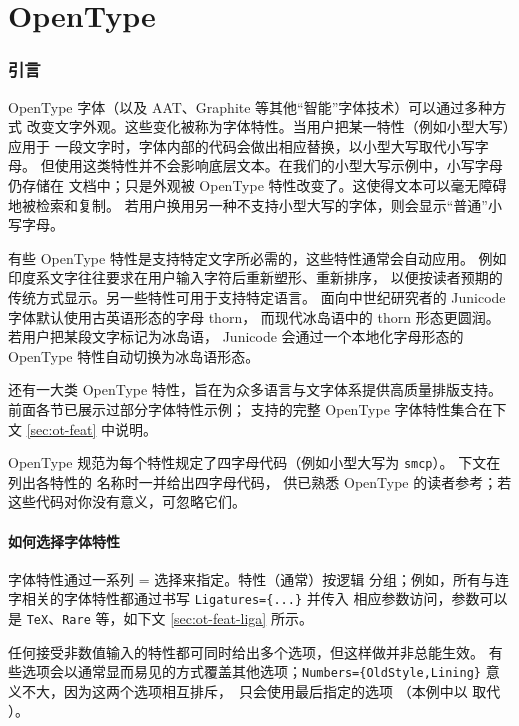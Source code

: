 \documentclass[a4paper]{l3doc}
\begin{document}
\part{OpenType}
\label{sec:opentype-features}

\section{引言}
\label{sec:opentype-features-intro}

OpenType 字体（以及 AAT、Graphite 等其他“智能”字体技术）可以通过多种方式
改变文字外观。这些变化被称为字体特性。当用户把某一特性（例如小型大写）应用于
一段文字时，字体内部的代码会做出相应替换，以小型大写取代小写字母。
但使用这类特性并不会影响底层文本。在我们的小型大写示例中，小写字母仍存储在
文档中；只是外观被 OpenType 特性改变了。这使得文本可以毫无障碍地被检索和复制。
若用户换用另一种不支持小型大写的字体，则会显示“普通”小写字母。

有些 OpenType 特性是支持特定文字所必需的，这些特性通常会自动应用。
例如印度系文字往往要求在用户输入字符后重新塑形、重新排序，
以便按读者预期的传统方式显示。另一些特性可用于支持特定语言。
面向中世纪研究者的 Junicode 字体默认使用古英语形态的字母 thorn，
而现代冰岛语中的 thorn 形态更圆润。若用户把某段文字标记为冰岛语，
Junicode 会通过一个本地化字母形态的 OpenType 特性自动切换为冰岛语形态。

还有一大类 OpenType 特性，旨在为众多语言与文字体系提供高质量排版支持。
前面各节已展示过部分字体特性示例； 支持的完整 OpenType
字体特性集合在下文 \ref{sec:ot-feat} 中说明。

OpenType 规范为每个特性规定了四字母代码（例如小型大写为 \texttt{smcp}）。
下文在列出各特性的  名称时一并给出四字母代码，
供已熟悉 OpenType 的读者参考；若这些代码对你没有意义，可忽略它们。


\subsection{如何选择字体特性}

字体特性通过一系列 = 选择来指定。特性（通常）按逻辑
分组；例如，所有与连字相关的字体特性都通过书写 \verb|Ligatures={...}| 并传入
相应参数访问，参数可以是 \texttt{TeX}、\texttt{Rare} 等，如下文
\ref{sec:ot-feat-liga} 所示。

任何接受非数值输入的特性都可同时给出多个选项，但这样做并非总能生效。
有些选项会以通常显而易见的方式覆盖其他选项；\Verb|Numbers={OldStyle,Lining}|
意义不大，因为这两个选项相互排斥，\XeTeX\ 只会使用最后指定的选项
（本例中以  取代 ）。
\end{document}
